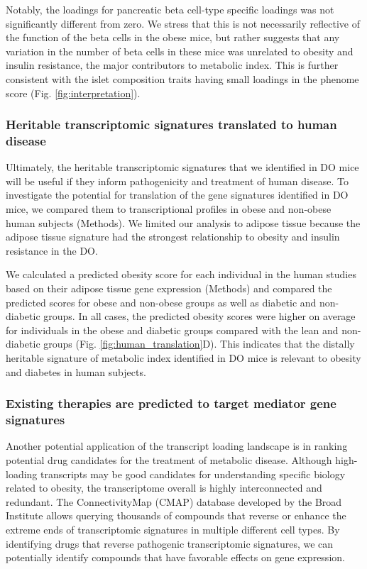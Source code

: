 \documentclass[
]{article}
\begin{document}
Notably, the loadings for pancreatic beta cell-type specific loadings
was not significantly different from zero. We stress that this is not
necessarily reflective of the function of the beta cells in the obese
mice, but rather suggests that any variation in the number of beta cells
in these mice was unrelated to obesity and insulin resistance, the major
contributors to metabolic index. This is further consistent with the
islet composition traits having small loadings in the phenome score
(Fig. \ref{fig:interpretation}).

\subsubsection{Heritable transcriptomic signatures translated to human
disease}\label{heritable-transcriptomic-signatures-translated-to-human-disease}

Ultimately, the heritable transcriptomic signatures that we identified
in DO mice will be useful if they inform pathogenicity and treatment of
human disease. To investigate the potential for translation of the gene
signatures identified in DO mice, we compared them to transcriptional
profiles in obese and non-obese human subjects (Methods). We limited our
analysis to adipose tissue because the adipose tissue signature had the
strongest relationship to obesity and insulin resistance in the DO.

We calculated a predicted obesity score for each individual in the human
studies based on their adipose tissue gene expression (Methods) and
compared the predicted scores for obese and non-obese groups as well as
diabetic and non-diabetic groups. In all cases, the predicted obesity
scores were higher on average for individuals in the obese and diabetic
groups compared with the lean and non-diabetic groups (Fig.
\ref{fig:human_translation}D). This indicates that the distally
heritable signature of metabolic index identified in DO mice is relevant
to obesity and diabetes in human subjects.

\subsubsection{Existing therapies are predicted to target mediator gene
signatures}\label{existing-therapies-are-predicted-to-target-mediator-gene-signatures}

Another potential application of the transcript loading landscape is in
ranking potential drug candidates for the treatment of metabolic
disease. Although high-loading transcripts may be good candidates for
understanding specific biology related to obesity, the transcriptome
overall is highly interconnected and redundant. The ConnectivityMap
(CMAP) database \cite{pmid17008526} developed by the Broad Institute
allows querying thousands of compounds that reverse or enhance the
extreme ends of transcriptomic signatures in multiple different cell
types. By identifying drugs that reverse pathogenic transcriptomic
signatures, we can potentially identify compounds that have favorable
effects on gene expression.
\end{document}
